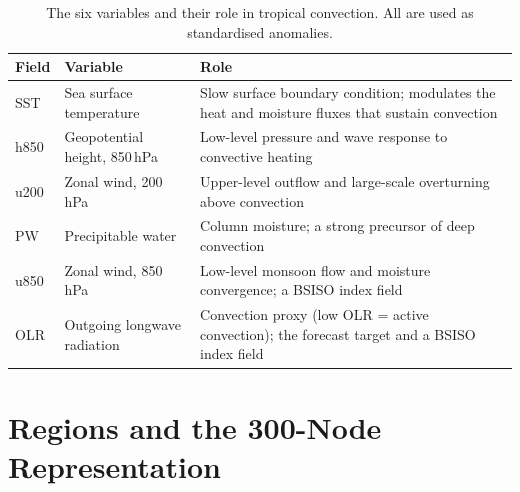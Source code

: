\begin{table}[htbp]
\centering
\caption{The six variables and their role in tropical convection. All are used as standardised anomalies.}
\label{tab:variables}
\footnotesize
\renewcommand{\arraystretch}{1.2}
\begin{tabularx}{\textwidth}{>{\raggedright\arraybackslash}p{1.1cm}>{\raggedright\arraybackslash}p{3.6cm}>{\raggedright\arraybackslash}X}
\toprule
\textbf{Field} & \textbf{Variable} & \textbf{Role} \\
\midrule
SST & Sea surface temperature & Slow surface boundary condition; modulates the heat and moisture fluxes that sustain convection \\
h850 & Geopotential height, 850\,hPa & Low-level pressure and wave response to convective heating \\
u200 & Zonal wind, 200\,hPa & Upper-level outflow and large-scale overturning above convection \\
PW & Precipitable water & Column moisture; a strong precursor of deep convection \\
u850 & Zonal wind, 850\,hPa & Low-level monsoon flow and moisture convergence; a BSISO index field \\
OLR & Outgoing longwave radiation & Convection proxy (low OLR = active convection); the forecast target and a BSISO index field \\
\bottomrule
\end{tabularx}
\end{table}

\section{Regions and the 300-Node Representation}
\label{sec:data-regions}

